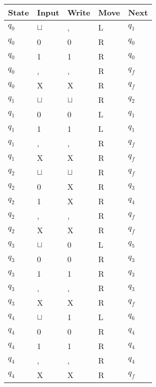 \documentclass[a4paper, hidelinks, twocolumn, 9pt]{article}
\newcommand{\blm}{\sqcup}
\newcommand{\bl}{\(\blm\)}
\begin{document}
  \begin{table}
    \centering
    \begin{tabular}{x{1cm}x{1cm}x{1cm}x{1cm}x{1cm}}
      \toprule
      State & Input & Write & Move & Next \\
      \midrule
      \(q_0\) & \bl &   , & L & \(q_1\) \\
      \(q_0\) &   0 &   0 & R & \(q_0\) \\
      \(q_0\) &   1 &   1 & R & \(q_0\) \\
      \(q_0\) &   , &   , & R & \(q_f\) \\
      \(q_0\) &   X &   X & R & \(q_f\) \\
      \midrule
      \(q_1\) & \bl & \bl & R & \(q_2\) \\
      \(q_1\) &   0 &   0 & L & \(q_1\) \\
      \(q_1\) &   1 &   1 & L & \(q_1\) \\
      \(q_1\) &   , &   , & R & \(q_f\) \\
      \(q_1\) &   X &   X & R & \(q_f\) \\
      \midrule
      \(q_2\) & \bl & \bl & R & \(q_f\) \\
      \(q_2\) &   0 &   X & R & \(q_3\) \\
      \(q_2\) &   1 &   X & R & \(q_4\) \\
      \(q_2\) &   , &   , & R & \(q_f\) \\
      \(q_2\) &   X &   X & R & \(q_f\) \\
      \midrule
      \(q_3\) & \bl &   0 & L & \(q_5\) \\
      \(q_3\) &   0 &   0 & R & \(q_3\) \\
      \(q_3\) &   1 &   1 & R & \(q_3\) \\
      \(q_3\) &   , &   , & R & \(q_3\) \\
      \(q_3\) &   X &   X & R & \(q_f\) \\
      \midrule
      \(q_4\) & \bl &   1 & L & \(q_6\) \\
      \(q_4\) &   0 &   0 & R & \(q_4\) \\
      \(q_4\) &   1 &   1 & R & \(q_4\) \\
      \(q_4\) &   , &   , & R & \(q_4\) \\
      \(q_4\) &   X &   X & R & \(q_f\) \\
      \midrule

\end{tabular}
\end{table}
\end{document}
